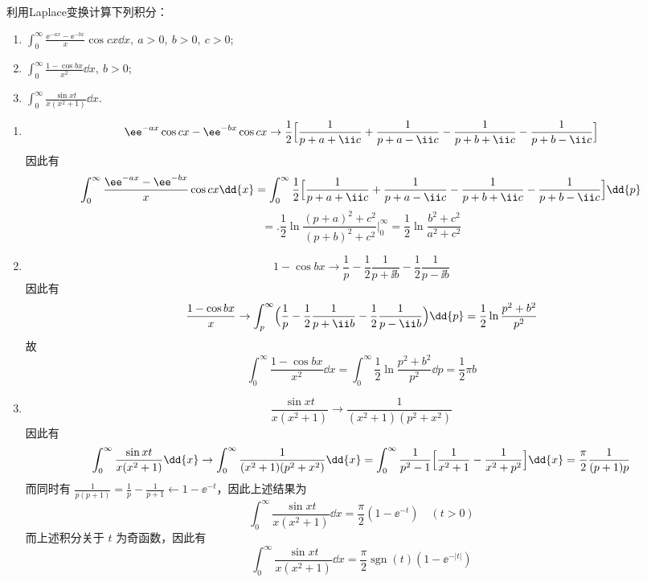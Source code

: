 \begin{question}
利用Laplace变换计算下列积分：
\begin{enumerate}
  \item \(\displaystyle\int_0^\infty \frac{\ee^{-a x}-\ee^{-b x}}{x}\cos c x\dd{x},\ a>0,\ b>0,\ c>0\);

  \item \(\displaystyle\int_0^\infty \frac{1-\cos b x}{x^2}\dd{x},\ b>0\);

  \item \(\displaystyle\int_0^\infty \frac{\sin x t}{x(x^2+1)}\dd{x}\).
\end{enumerate}
\begin{solution}
\begin{enumerate}
  \item \[ \ee^{-a x}\cos c x - \ee^{-b x}\cos c x \to \frac12\Bigl[\frac1{p+a+\ii c}+\frac1{p+a-\ii c}-\frac1{p+b+\ii c}-\frac1{p+b-\ii c}\Bigr] \]因此有 \[ \int_0^\infty \frac{\ee^{-a x}-\ee^{-b x}}{x}\cos c x\dd{x} = \int_0^\infty \frac12\Bigl[\frac1{p+a+\ii c}+\frac1{p+a-\ii c}-\frac1{p+b+\ii c}-\frac1{p+b-\ii c}\Bigr]\dd{p} \] \[ = \bigl.\frac12\ln\frac{(p+a)^2+c^2}{(p+b)^2+c^2}\bigr|_0^\infty = \frac12\ln\frac{b^2+c^2}{a^2+c^2} \]

  \item \[ 1-\cos b x \to \frac1p-\frac12\frac1{p+\ii b}-\frac12\frac1{p-\ii b} \]因此有 \[ \frac{1-\cos b x}{x} \to \int_p^\infty \Bigl(\frac1p-\frac12\frac1{p+\ii b}-\frac12\frac1{p-\ii b}\Bigr)\dd{p} = \frac12\ln\frac{p^2+b^2}{p^2} \]故 \[ \int_0^\infty \frac{1-\cos b x}{x^2}\dd{x} = \int_0^\infty \frac12\ln\frac{p^2+b^2}{p^2}\dd{p} = \frac12\pi b \]

  \item \[ \frac{\sin x t}{x(x^2+1)} \to \frac1{(x^2+1)(p^2+x^2)} \]因此有 \[ \int_0^\infty \frac{\sin x t}{x(x^2+1)}\dd{x} \to \int_0^\infty \frac1{(x^2+1)(p^2+x^2)}\dd{x} = \int_0^\infty \frac1{p^2-1}\Bigl[\frac1{x^2+1}-\frac1{x^2+p^2}\Bigr]\dd{x} = \frac{\pi}{2}\frac1{(p+1)p} \]而同时有 \(\displaystyle\frac1{p(p+1)} = \frac1p-\frac1{p+1} \gets 1-\ee^{-t}\)，因此上述结果为 \[ \int_0^\infty \frac{\sin x t}{x(x^2+1)}\dd{x} = \frac{\pi}{2}(1-\ee^{-t})\quad (t>0) \]而上述积分关于 \(t\) 为奇函数，因此有 \[ \int_0^\infty \frac{\sin x t}{x(x^2+1)}\dd{x} = \frac{\pi}{2}\operatorname{sgn}(t)(1-\ee^{-|t|}) \]
\end{enumerate}
\end{solution}
\end{question}


